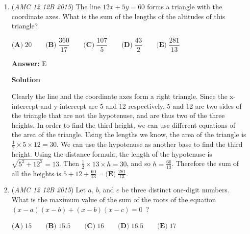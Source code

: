 \begin{enumerate}
 There are no triangles when $a = 1$ because then $c$ must be less than $b+1$, implying that $b \geq c$, contrary to $b < c$.

 When $a=2$, similar to above, $c$ must be less than $b+2$, so this leaves the only possibility $c = b+1$. This gives 3 triangles $(2,3,4), (2,4,5), (2,5,6)$ within our perimeter constraint.

 When $a=3$, $c$ can be $b+1$ or $b+2$, which gives triangles $(3,4,5), (3,4,6), (3,5,6)$. Note that $(3,4,5)$ is a right triangle, so we get rid of it and we get only 2 triangles.

 All in all, this gives us $3+2 = \boxed{\textbf{(C)}\; 5}$ triangles.

 


	\item (\textit{AMC 12 12B 2015}) The line $12x+5y=60$ forms a triangle with the coordinate axes. What is the sum of the lengths of the altitudes of this triangle?


 $\textbf{(A)}\; 20 \qquad\textbf{(B)}\; \dfrac{360}{17} \qquad\textbf{(C)}\; \dfrac{107}{5} \qquad\textbf{(D)}\; \dfrac{43}{2} \qquad\textbf{(E)}\; \dfrac{281}{13}$

 \textbf{Answer: }E



\textbf{Solution}

Clearly the line and the coordinate axes form a right triangle. Since the x-intercept and y-intercept are 5 and 12 respectively, 5 and 12 are two sides of the triangle that are not the hypotenuse, and are thus two of the three heights. In order to find the third height, we can use different equations of the area of the triangle. Using the lengths we know, the area of the triangle is $\frac{1}{2} \times 5 \times 12= 30$. We can use the hypotenuse as another base to find the third height. Using the distance formula, the length of the hypotenuse is $\sqrt{5^2+12^2}=13$. Then $\frac{1}{2} \times 13 \times h=30$, and so $h = \frac{60}{13}$. Therefore the sum of all the heights is $5+12+\frac{60}{13}=\boxed{\textbf{(E)}\; \frac{281}{13}}$.

 


	\item (\textit{AMC 12 12B 2015}) Let $a$, $b$, and $c$ be three distinct one-digit numbers. What is the maximum value of the sum of the roots of the equation $(x-a)(x-b)+(x-b)(x-c)=0$ ?


 $\textbf{(A)}\; 15 \qquad\textbf{(B)}\; 15.5 \qquad\textbf{(C)}\; 16 \qquad\textbf{(D)}\; 16.5 \qquad\textbf{(E)}\; 17$


\end{enumerate}
